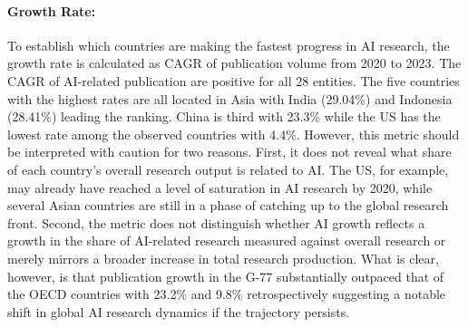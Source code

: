 \documentclass{article}
\begin{document}
	\paragraph{Growth Rate:} To establish which countries are making the fastest progress in AI research, the growth rate is calculated as CAGR of publication volume from 2020 to 2023. The CAGR of AI-related publication are positive for all 28 entities. The five countries with the highest rates are all located in Asia with India (29.04\%) and Indonesia (28.41\%) leading the ranking. China is third with 23.3\% while the US has the lowest rate among the observed countries with 4.4\%. However, this metric should be interpreted with caution for two reasons. First, it does not reveal what share of each country’s overall research output is related to AI. The US, for example, may already have reached a level of saturation in AI research by 2020, while several Asian countries are still in a phase of catching up to the global research front. Second, the metric does not distinguish whether AI growth reflects a growth in the share of AI-related research measured against overall research or merely mirrors a broader increase in total research production. What is clear, however, is that publication growth in the G-77 substantially outpaced that of the OECD countries with 23.2\% and 9.8\% retrospectively suggesting a notable shift in global AI research dynamics if the trajectory persists.
	
\end{document}
